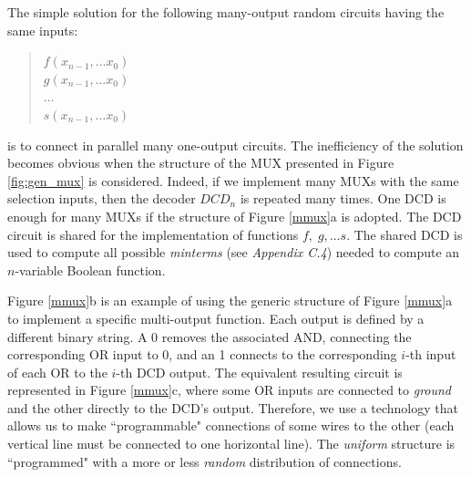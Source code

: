 The simple solution for the following many-output random circuits
having the same inputs:


\begin{quote}
$f(x_{n-1}, \ldots x_{0})$ \\
$g(x_{n-1}, \ldots x_{0})$ \\
$\ldots$ \\
$s(x_{n-1}, \ldots x_{0})$
\end{quote}


\hspace{-6mm}is to connect in parallel many one-output circuits. The
inefficiency of the solution becomes obvious when the structure of
the MUX presented in Figure \ref{fig:gen_mux} is considered. Indeed, if we
implement many MUXs with the same selection inputs, then the
decoder $DCD_{n}$ is repeated many times. One DCD is enough for
many MUXs if the structure of Figure \ref{mmux}a is adopted. The
DCD circuit is shared for the implementation of functions $f, \; g,
\ldots s$. The shared DCD is used to compute all possible {\em
minterms} (see {\em Appendix C.4}) needed to compute an
$n$-variable Boolean function.




Figure \ref{mmux}b is an example of using the generic structure
of Figure \ref{mmux}a to implement a specific multi-output
function. Each output is defined by a different binary string. A 0
removes the associated AND, connecting the corresponding OR input
to 0, and an 1 connects to the corresponding $i$-th input of each
OR to the $i$-th DCD output. The equivalent resulting circuit is
represented in Figure \ref{mmux}c, where some OR inputs are
connected to {\em ground} and the other directly to the DCD's output.
Therefore, we use a technology that allows us to make ``programmable"
connections of some wires to the other (each vertical line must be
connected to one horizontal line). The {\em uniform} structure is
``programmed" with a more or less {\em random} distribution of
connections.


